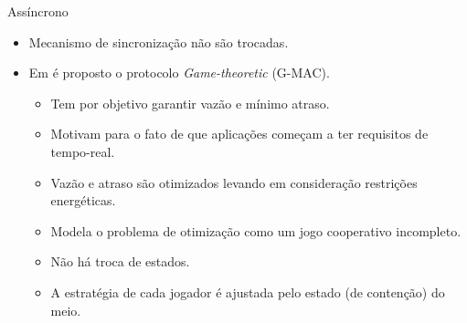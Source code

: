 \documentclass{beamer}
\begin{document}
\begin{frame}{Assíncrono}
  \begin{itemize}
    \item Mecanismo de sincronização não são trocadas.
    \item Em \cite{20093112234782} é proposto o protocolo \emph{Game-theoretic} (G-MAC).
      \begin{itemize}
	\item Tem por objetivo garantir vazão e mínimo atraso.
	\item Motivam para o fato de que aplicações começam a ter requisitos de tempo-real.
	\item Vazão e atraso são otimizados levando em consideração restrições energéticas.
	\item Modela o problema de otimização como um jogo cooperativo incompleto.
	\item Não há troca de estados.
	\item A estratégia de cada jogador é ajustada pelo estado (de contenção) do meio.
	\hypertarget{quadro_g-mac_back}{}
      \end{itemize}
  \end{itemize}
\end{frame}
\end{document}
